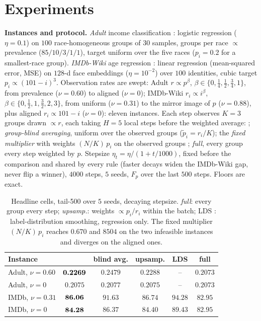 \section{Experiments}
\label{sec:exp}

\noindent\textbf{Instances and protocol.}
\emph{Adult} income classification \cite{uci_adult}: logistic regression
($\eta{=}0.1$) on $100$ race-homogeneous groups of $30$ samples, groups per
race $\propto$ prevalence ($85/10/3/1/1$), target uniform over the five
races ($p_i=0.2$ for a smallest-race group). \emph{IMDb-Wiki} age
regression \cite{rothe2018imdbwiki}: linear regression (mean-squared
error, MSE) on $128$-d face embeddings ($\eta{=}10^{-2}$) over $100$ identities, cubic target
$p_i\propto(101-i)^3$. Observation rates are swept: Adult $r\propto
p^{\beta}$, $\beta\in\{0,\tfrac14,\tfrac12,\tfrac34,1\}$, from prevalence
($\nu{=}0.60$) to aligned ($\nu{=}0$); IMDb-Wiki $r_i\propto i^{\beta}$,
$\beta\in\{0,\tfrac12,1,\tfrac32,2,3\}$, from uniform ($\nu{=}0.31$) to the
mirror image of $p$ ($\nu{=}0.88$), plus aligned $r_i\propto 101-i$
($\nu{=}0$): eleven instances. Each step observes $K{=}3$ groups drawn
$\propto r$, each taking $H{=}5$ local steps before the weighted average: \avot{}; \emph{group-blind averaging}, uniform over
the observed groups ($\tilde p_i=r_i/K$); the \emph{fixed multiplier}
with weights $(N/K)\,p_i$ on the observed groups \cite{rahimi2025fedavot};
\emph{full}, every group every step weighted by $p$. Stepsize
$\eta_t=\eta/(1+t/1000)$, fixed before the comparison and shared by every
rule (faster decays widen the IMDb-Wiki gap, never flip a winner), $4000$
steps, $5$ seeds, $F_p$ over the last $500$ steps. Floors are exact.

\begin{table}[t]
\centering
\caption{Headline cells, tail-500 over $5$ seeds, decaying stepsize. \emph{full}:
every group every step; \emph{upsamp.}: weights $\propto p_i/r_i$ within the
batch; LDS \cite{yang2021dir}: label-distribution smoothing, regression only.
The fixed multiplier $(N/K)\,p_i$ reaches $0.670$ and $8504$ on the two infeasible
instances and diverges on the aligned ones.}
\label{tab:overall}
\small\setlength{\tabcolsep}{3pt}
\begin{tabular}{lccccc}
\toprule
Instance & \avot{} & blind avg. & upsamp. & LDS & full \\
\midrule
Adult, $\nu{=}0.60$ & $\textbf{0.2269}$ & $0.2479$ & $0.2288$ & -- & $0.2073$ \\
Adult, $\nu{=}0$   & $0.2075$ & $0.2077$ & $0.2075$ & -- & $0.2073$ \\
IMDb, $\nu{=}0.31$  & $\textbf{86.06}$ & $91.63$ & $86.74$ & $94.28$ & $82.95$ \\
IMDb, $\nu{=}0$    & $\textbf{84.28}$ & $86.37$ & $84.40$ & $89.43$ & $82.95$ \\
\bottomrule
\end{tabular}
\vspace{-8pt}
\end{table}

